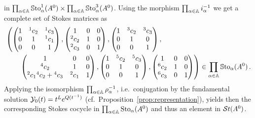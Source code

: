 in
$\prod_{\alpha\in\mathbb{A}}\operatorname{\mathbb{S}to}_{\alpha}^{1}(A^0) \times
\prod_{\alpha\in\mathbb{A}}\operatorname{\mathbb{S}to}_{\alpha}^{3}(A^0)$.
Using the morphism $\prod_{\alpha\in\mathbb{A}}i_\alpha^{-1}$ we get a complete set of
Stokes matrices as
\begin{align*}
  &\left(
    \begin{pmatrix} 1 & {}^1c_2 & {}^1c_3 \\0 & 1 & {}^1c_1 \\0 & 0 & 1 \end{pmatrix},
    \begin{pmatrix} 1 & 0 & 0 \\{}^2c_2 & 1 & 0 \\{}^2c_3 & 0 & 1 \end{pmatrix},
    \begin{pmatrix} 1 & {}^3c_2 & {}^3c_3 \\0 & 1 & 0 \\0 & 0 & 1 \end{pmatrix},
  \right.
\\&\qquad
  \left.
    \begin{pmatrix} 1 & 0 & 0 \\{}^4c_2 & 1 & 0 \\{}^2c_1{}^4c_2+{}^4c_3 & {}^2c_1 & 1 \end{pmatrix},
    \begin{pmatrix} 1 & {}^5c_2 & {}^5c_3 \\0 & 1 & 0 \\0 & 0 & 1 \end{pmatrix},
    \begin{pmatrix} 1 & 0 & 0 \\{}^{6}c_2 & 1 & 0 \\{}^{6}c_3 & 0 & 1 \end{pmatrix}
  \right)
  \in
  \prod_{\alpha\in\mathbb{A}}\operatorname{\mathbb{S}to}_{\alpha}(A^0) \,.
\end{align*}
Applying the isomorphism $\prod_{\alpha\in\mathbb{A}}\rho_\alpha^{-1}$, i.e.\
conjugation by the fundamental solution $\mathcal{Y}_0(t)=t^Le^{Q(t^{-1})}$
(cf.\ Proposition~\ref{prop:representation}), yields then the corresponding
Stokes cocycle in $\prod_{\alpha\in\mathbb{A}}\operatorname{Sto}_{\alpha}(A^0)$ and thus an element
in $\mathcal{S}{}t(A^0)$.
